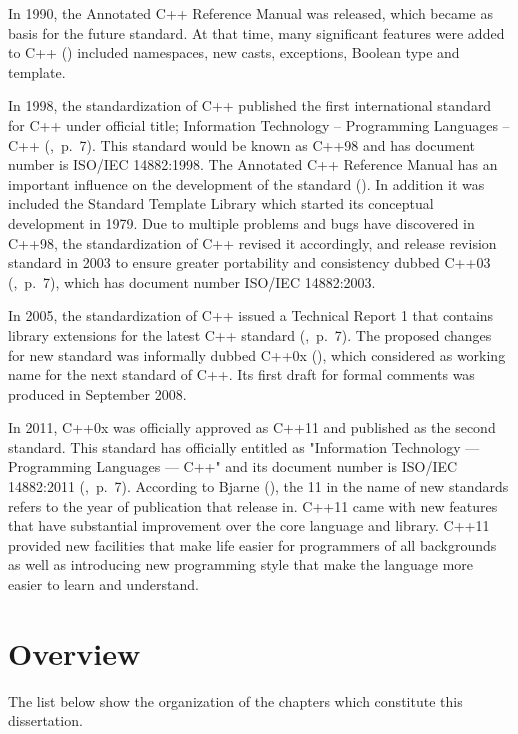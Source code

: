 \documentclass[11pt]{report}
\begin{document}
In 1990, the Annotated C++ Reference Manual was released, which became as basis for the future standard. At that time, many significant features were added to C++  (\cite{StroustrupHistory}) included namespaces, new casts, exceptions, Boolean type and template.

In 1998, the standardization of C++ published the first international standard for C++ under official title; Information Technology -- Programming Languages -- C++ (\cite{Josuttis:2012:CppStandard},~p.~7). This standard would be known as C++98 and has document number is ISO/IEC 14882:1998. The Annotated C++ Reference Manual has an important influence on the development of the standard (\cite{CplusplusHistoryofCpp}). In addition it was included the Standard Template Library which started its conceptual development in 1979. Due to multiple problems and bugs have discovered in C++98, the standardization of C++ revised it accordingly, and release revision standard in 2003 to ensure greater portability and consistency dubbed C++03 (\cite{Josuttis:2012:CppStandard},~p.~7), which has document number ISO/IEC 14882:2003.

In 2005, the standardization of C++ issued a Technical Report 1 that contains library extensions for the latest C++ standard (\cite{Josuttis:2012:CppStandard},~p.~7). The proposed changes for new standard was informally dubbed C++0x (\cite{CplusplusHistoryofCpp}), which considered as working name for the next standard of C++. Its first draft for formal comments was produced in September 2008. 

In 2011, C++0x was officially approved as C++11 and published as the second standard. This standard has officially entitled as "Information Technology — Programming Languages — C++" and its document number is ISO/IEC 14882:2011 (\cite{Josuttis:2012:CppStandard},~p.~7). According to Bjarne (\cite{Stroustrup:2012:Cpp11}), the 11 in the name of new standards refers to the year of publication that release in. C++11 came with new features that have substantial improvement over the core language and library. C++11 provided new facilities that make life easier for programmers of all backgrounds as well as introducing new programming style  that make the language more easier to learn and understand.

\section{Overview}
\label{sec:Overview}
The list below show the organization of the chapters which constitute this dissertation.
\end{document}
